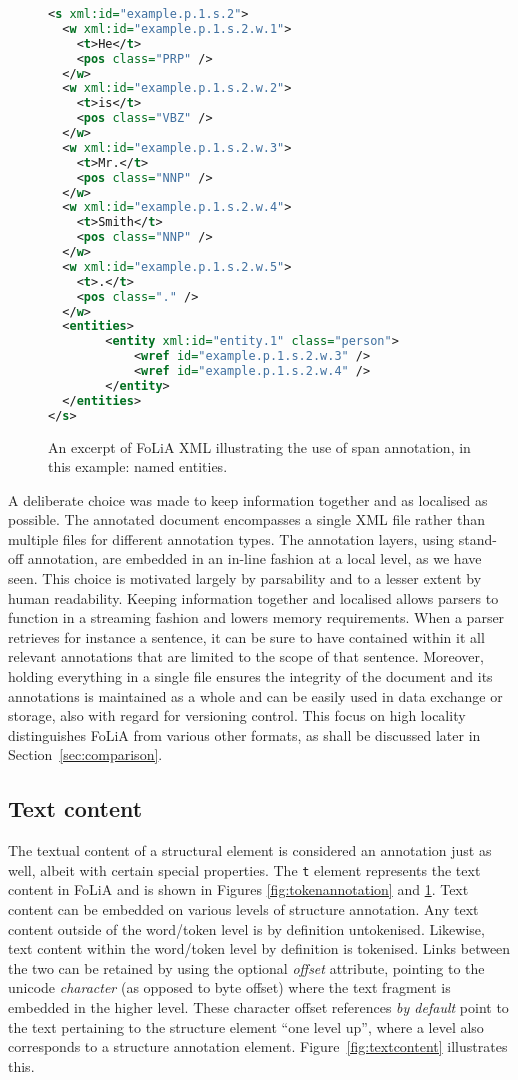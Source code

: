 \documentclass[a4paper,10pt,twoside]{article}
\begin{document}
\begin{figure}[tbh]
\begin{lstlisting}[language=xml]
<s xml:id="example.p.1.s.2">
  <w xml:id="example.p.1.s.2.w.1">
    <t>He</t>
    <pos class="PRP" />
  </w>
  <w xml:id="example.p.1.s.2.w.2">
    <t>is</t>
    <pos class="VBZ" />
  </w>
  <w xml:id="example.p.1.s.2.w.3">
    <t>Mr.</t>
    <pos class="NNP" />
  </w>
  <w xml:id="example.p.1.s.2.w.4">
    <t>Smith</t>
    <pos class="NNP" />
  </w>
  <w xml:id="example.p.1.s.2.w.5">
    <t>.</t>
    <pos class="." />
  </w>
  <entities>
        <entity xml:id="entity.1" class="person">
            <wref id="example.p.1.s.2.w.3" />
            <wref id="example.p.1.s.2.w.4" />
        </entity>
  </entities>
</s>
\end{lstlisting}
\caption{An excerpt of FoLiA XML illustrating the use of span annotation, in this example: named entities.\label{fig:spanannotation}}
\end{figure}

A deliberate choice was made to keep information together and as localised as
possible. The annotated document encompasses a single XML file rather than
multiple files for different annotation types. The annotation layers,  using
stand-off annotation, are embedded in an in-line fashion at a local level, as
we have seen. This choice is motivated largely by parsability and to a lesser
extent by human readability. Keeping information together and localised allows
parsers to function in a streaming fashion and lowers memory requirements. When
a parser retrieves for instance a sentence, it can be sure to have contained
within it all relevant annotations that are limited to the scope of that
sentence. Moreover, holding everything in a single file ensures the integrity
of the document and its annotations is maintained as a whole and can be easily
used in data exchange or storage, also with regard for versioning control. This
focus on high locality distinguishes FoLiA from various other formats, as shall
be discussed later in Section~\ref{sec:comparison}. 

\subsection{Text content} 

The textual content of a structural element is considered an annotation just as
well, albeit with certain special properties. The \texttt{t} element represents
the text content in FoLiA and is shown in Figures  \ref{fig:tokenannotation}
and \ref{fig:spanannotation}. Text content can be embedded on various levels of
structure annotation. Any text content outside of the word/token level is by
definition untokenised. Likewise, text content within the word/token level by
definition is tokenised. Links between the two can be retained by using the
optional \emph{offset} attribute, pointing to the unicode \emph{character} (as opposed
to byte offset) where the text fragment is embedded in the higher level. 
These character offset references \emph{by default} point to the text pertaining to
the structure element ``one level up'', where a level also corresponds to a
structure annotation element. Figure~\ref{fig:textcontent} illustrates this.
\end{document}
